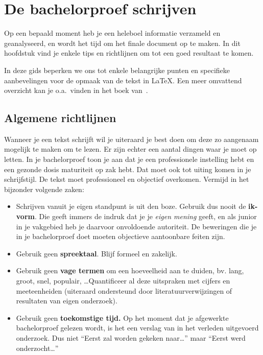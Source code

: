 \chapter{De bachelorproef schrijven}
\label{ch:schrijven}

Op een bepaald moment heb je een heleboel informatie verzameld en geanalyseerd, en wordt het tijd om het finale document op te maken. In dit hoofdstuk vind je enkele tips en richtlijnen om tot een goed resultaat te komen.

In deze gids beperken we ons tot enkele belangrijke punten en specifieke aanbevelingen voor de opmaak van de tekst in {\LaTeX}. Een meer omvattend overzicht kan je o.a.~vinden in het boek van~\textcite{Pollefliet2011}.

\section{Algemene richtlijnen}
\label{ch:algemene-richtlijnen}

Wanneer je een tekst schrijft wil je uiteraard je best doen om deze zo aangenaam mogelijk te maken om te lezen. Er zijn echter een aantal dingen waar je moet op letten. In je bachelorproef toon je aan dat je een professionele instelling hebt en een gezonde dosis maturiteit op zak hebt. Dat moet ook tot uiting komen in je schrijfstijl. De tekst moet professioneel en objectief overkomen. Vermijd in het bijzonder volgende zaken:

\begin{itemize}
  \item Schrijven vanuit je eigen standpunt is uit den boze. Gebruik dus nooit de \textbf{ik-vorm}. Die geeft immers de indruk dat je je \emph{eigen mening} geeft, en als junior in je vakgebied heb je daarvoor onvoldoende autoriteit. De beweringen die je in je bachelorproef doet moeten objectieve aantoonbare feiten zijn.
  \item Gebruik geen \textbf{spreektaal}. Blijf formeel en zakelijk.
  \item Gebruik geen \textbf{vage termen} om een hoeveelheid aan te duiden, bv. lang, groot, snel, populair, \ldots Quantificeer al deze uitspraken met cijfers en meeteenheiden (uiteraard ondersteund door literatuurverwijzingen of resultaten van eigen onderzoek).
  \item Gebruik geen \textbf{toekomstige tijd.} Op het moment dat je afgewerkte bachelorproef gelezen wordt, is het een verslag van in het verleden uitgevoerd onderzoek. Dus niet ``Eerst zal worden gekeken naar\ldots'' maar ``Eerst werd onderzocht\ldots''
\end{itemize}

